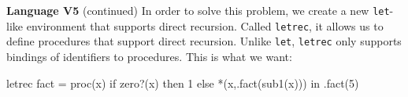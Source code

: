 \begin{minipage}[t]{\sw}
\slidenumber
\LARGE
{\bf Language V5} (continued)\exx
In order to solve this problem,
we create a new \verb'let'-like environment
that supports direct recursion.
Called \verb'letrec',
it allows us to define procedures
that support direct recursion.
Unlike \verb'let', \verb'letrec' only supports bindings
of identifiers to procedures.\exx
This is what we want:
\Large
\begin{qv}
letrec
  fact = proc(x) if zero?(x) then 1 else *(x,.fact(sub1(x)))
in
  .fact(5)
\end{qv}
\end{minipage}
